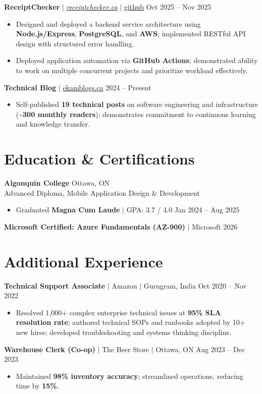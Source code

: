 \documentclass[11pt,a4paper]{article}
\begin{document}
\vspace{4pt}

\textbf{ReceiptChecker} $|$ \href{https://receiptchecker.ca/}{\emph{receiptchecker.ca}} $|$ \href{https://github.com/bhat0155/receipt-check}{\small github} \hfill Oct 2025 -- Nov 2025
\begin{itemize}
    \item Designed and deployed a backend service architecture using \textbf{Node.js/Express}, \textbf{PostgreSQL}, and \textbf{AWS}; implemented RESTful API design with structured error handling.
    \item Deployed application automation via \textbf{GitHub Actions}; demonstrated ability to work on multiple concurrent projects and prioritize workload effectively.
\end{itemize}

\vspace{4pt}

\textbf{Technical Blog} $|$ \href{https://www.ekamblogs.ca}{ekamblogs.ca} \hfill 2024 -- Present
\begin{itemize}
    \item Self-published \textbf{19 technical posts} on software engineering and infrastructure (\textasciitilde\textbf{300 monthly readers}); demonstrates commitment to continuous learning and knowledge transfer.
\end{itemize}

\section{Education \& Certifications}

\textbf{Algonquin College} \hfill Ottawa, ON \\
Advanced Diploma, Mobile Application Design \& Development
\begin{itemize}
    \item Graduated \textbf{Magna Cum Laude} $|$ GPA: 3.7 / 4.0 \hfill Jan 2024 -- Aug 2025
\end{itemize}
\textbf{Microsoft Certified: Azure Fundamentals (AZ-900)} $|$ Microsoft \hfill 2026

\section{Additional Experience}

\textbf{Technical Support Associate} $|$ Amazon $|$ Gurugram, India \hfill Oct 2020 -- Nov 2022
\begin{itemize}
    \item Resolved 1,000+ complex enterprise technical issues at \textbf{95\% SLA resolution rate}; authored technical SOPs and runbooks adopted by 10+ new hires; developed troubleshooting and systems thinking discipline.
\end{itemize}

\vspace{4pt}

\textbf{Warehouse Clerk (Co-op)} $|$ The Beer Store $|$ Ottawa, ON \hfill Aug 2023 -- Dec 2023
\begin{itemize}
    \item Maintained \textbf{98\% inventory accuracy}; streamlined operations, reducing time by \textbf{15\%}.
\end{itemize}
\end{document}
